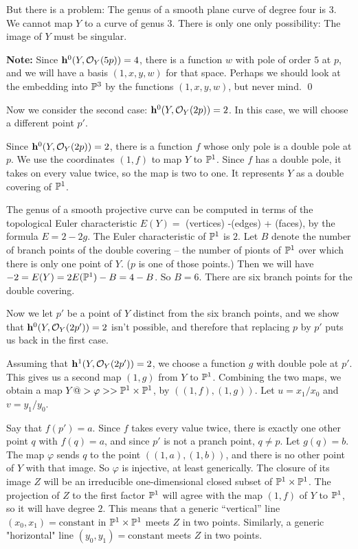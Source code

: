 \documentclass[leqno]{book}
\theoremstyle{definition}%
\numberwithin{equation}{section}
\theoremstyle{theorem} %
\begin{document}
But there is a problem: The genus of a smooth plane curve of degree
four is $3$.  We cannot map $Y$ to a curve of genus $3$.  There is
only one only possibility: The image of $Y$ must be singular.

\msno
{\bf Note:} Since $\hh^0(Y,\co_Y(5p)) = 4$, there is a function $w$
with pole of order $5$ at $p$, and we will have a basis $(1,x,y,w)$
for that space.  Perhaps we should look at the embedding into $\mathbb{P}^3$
by the functions $(1,x,y,w)$, but never mind. \qed

\msno Now we consider the second case: $\hh^0(Y,\co_Y(2p))=2$. 
In this case, we will choose a different point $p'$.

Since $\hh^0(Y,\co_Y(2p))=2$, there is a function $f$ whose only pole
is a double pole at $p$.  We use the coordinates $(1,f)$ to map $Y$ to
$\mathbb{P}^1$.  Since $f$ has a double pole, it takes on every value twice,
so the map is two to one.  It represents $Y$ as a double covering of
$\mathbb{P}^1$.

The genus of a smooth projective curve can be computed in terms
of the topological Euler characteristic $E(Y) = $ (vertices) -(edges)
+ (faces), by the formula $E = 2-2g$.  The Euler characteristic of
$\mathbb{P}^1$ is $2$.  Let $B$ denote the number of branch points of the
double covering -- the number of pionts of $\mathbb{P}^1$ over which there
is only one point of $Y$.  ($p$ is one of those points.)  Then we will
have $-2=E(Y) = 2 E(\mathbb{P}^1) - B = 4-B$.  So $B=6$.  There are six branch
points for the double covering.

Now we let $p'$ be a point of $Y$ distinct from the six
branch points, and we show that $\hh^0(Y,\co_Y(2p'))=2$ isn't
possible, and therefore that replacing $p$ by $p'$ puts us back in the
first case.

Assuming that $\hh^1(Y,\co_Y(2p'))=2$, we choose a function $g$ with
double pole at $p'$.  This gives us a second map $(1,g)$ from $Y$ to
$\mathbb{P}^1$.  Combining the two maps, we obtain a map $Y @>\varphi>>
\mathbb{P}^1\times\mathbb{P}^1$, by $((1,f),(1,g))$.  Let $u=x_1/x_0$ and $v=y_1/y_0$. 

Say that $f(p')=a$.  Since $f$ takes every value twice, there is
exactly one other point $q$ with $f(q)=a$, and since $p'$ is not a
pranch point, $q \neq p$.  Let $g(q) = b.$ The map $\varphi$ sends $q$
to the point $((1,a),(1,b))$, and there is no other point of $Y$ with
that image.  So $\varphi$ is injective, at least generically.  The
closure of its image $Z$ will be an irreducible one-dimensional closed
subset of $\mathbb{P}^1\times \mathbb{P}^1$.  The projection of $Z$ to the first
factor $\mathbb{P}^1$ will agree with the map $(1,f)$ of $Y$ to $\mathbb{P}^1$, so it
will have degree $2$.  This means that a generic ``vertical'' line
$(x_0,x_1)= \text{constant}$ in $\mathbb{P}^1\times\mathbb{P}^1$ meets $Z$ in two
points.  Similarly, a generic "horizontal" line $(y_0,y_1)=
\text{constant}$ meets $Z$ in two points.
\end{document}
